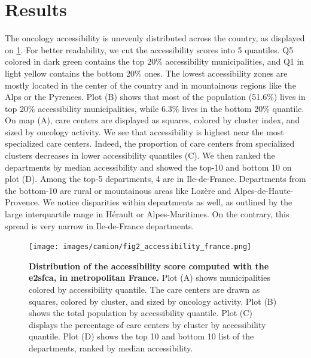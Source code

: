 \section{Results}

The oncology accessibility is unevenly distributed across the country, as
displayed on \cref{fig:accessibility-france}. For better readability, we cut the
accessibility scores into 5 quantiles. Q5 colored in dark green contains the top
20\% accessibility municipalities, and Q1 in light yellow contains the bottom
20\% ones. The lowest accessibility zones are mostly located in the center of
the country and in mountainous regions like the Alps or the Pyrenees. Plot (B)
shows that most of the population (51.6\%) lives in top 20\% accessibility
municipalities, while 6.3\% lives in the bottom 20\% quantile. On map (A), care
centers are displayed as squares, colored by cluster index, and sized by
oncology activity. We see that accessibility is highest near the most
specialized care centers. Indeed, the proportion of care centers from
specialized clusters decreases in lower accessibility quantiles (C). We then
ranked the departments by median accessibility and showed the top-10 and bottom
10 on plot (D). Among the top-5 departments, 4 are in Ile-de-France. Departments
from the bottom-10 are rural or mountainous areas like Lozère and
Alpes-de-Haute-Provence.  We notice disparities within departments as well, as
outlined by the large interquartile range in Hérault or Alpes-Maritimes. On the
contrary, this spread is very narrow in Ile-de-France departments.

\begin{figure}[h!]
    \texttt{[image: images/camion/fig2\_accessibility\_france.png]}
    \centering
    \caption{ \textbf{Distribution of the accessibility score computed with the
            \ac{e2sfca}, in metropolitan France.} Plot (A) shows municipalities
        colored by accessibility quantile. The care centers are drawn as
        squares, colored by cluster, and sized by oncology activity. Plot (B)
        shows the total population by accessibility quantile. Plot (C) displays
        the percentage of care centers by cluster by accessibility quantile.
        Plot (D) shows the top 10 and bottom 10 list of the departments, ranked
        by median accessibility. }
    \label{fig:accessibility-france}
\end{figure}

